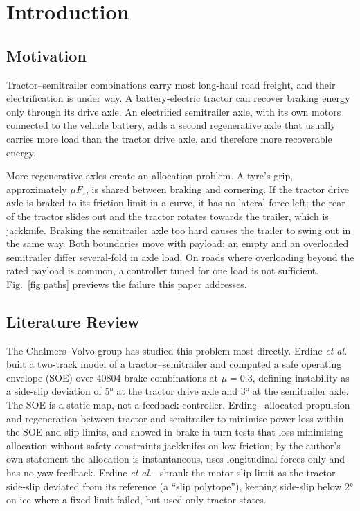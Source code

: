 \documentclass[conference]{IEEEtran}
\begin{document}
\section{Introduction}

\subsection{Motivation}
Tractor--semitrailer combinations carry most long-haul road freight, and their electrification is under way. A battery-electric tractor can recover braking energy only through its drive axle. An electrified semitrailer axle, with its own motors connected to the vehicle battery, adds a second regenerative axle that usually carries more load than the tractor drive axle, and therefore more recoverable energy.

More regenerative axles create an allocation problem. A tyre's grip, approximately $\mu F_z$, is shared between braking and cornering. If the tractor drive axle is braked to its friction limit in a curve, it has no lateral force left; the rear of the tractor slides out and the tractor rotates towards the trailer, which is jackknife. Braking the semitrailer axle too hard causes the trailer to swing out in the same way. Both boundaries move with payload: an empty and an overloaded semitrailer differ several-fold in axle load. On roads where overloading beyond the rated payload is common, a controller tuned for one load is not sufficient. Fig.~\ref{fig:paths} previews the failure this paper addresses.

\subsection{Literature Review}
The Chalmers--Volvo group has studied this problem most directly. Erdinc \emph{et al.}~\cite{erdinc2023} built a two-track model of a tractor--semitrailer and computed a safe operating envelope (SOE) over \num{40804} brake combinations at $\mu=0.3$, defining instability as a side-slip deviation of \ang{5} at the tractor drive axle and \ang{3} at the semitrailer axle. The SOE is a static map, not a feedback controller. Erdin\c{c}~\cite{erdinc2024thesis} allocated propulsion and regeneration between tractor and semitrailer to minimise power loss within the SOE and slip limits, and showed in brake-in-turn tests that loss-minimising allocation without safety constraints jackknifes on low friction; by the author's own statement the allocation is instantaneous, uses longitudinal forces only and has no yaw feedback. Erdinc \emph{et al.}~\cite{erdinc2024avec} shrank the motor slip limit as the tractor side-slip deviated from its reference (a ``slip polytope''), keeping side-slip below \ang{2} on ice where a fixed limit failed, but used only tractor states.
\end{document}
